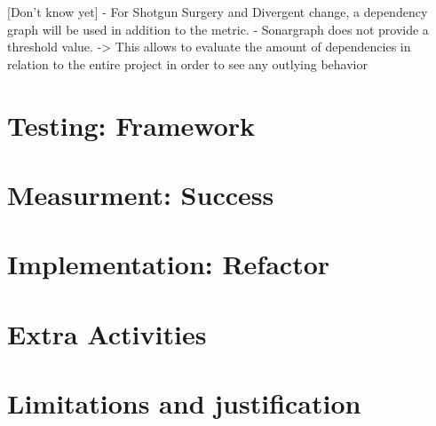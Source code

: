 [Don't know yet]
- For Shotgun Surgery and Divergent change, a dependency graph will be used in addition to the metric.
- Sonargraph does not provide a threshold value.
	-> This allows to evaluate the amount of dependencies in relation to the entire project in order to see any outlying behavior


\section{Testing: Framework}

\section{Measurment: Success}

\section{Implementation: Refactor}

\section{Extra Activities}

\section{Limitations and justification}
